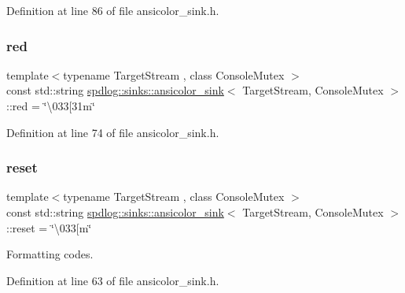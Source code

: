 Definition at line 86 of file ansicolor\+\_\+sink.\+h.

\mbox{\label{classspdlog_1_1sinks_1_1ansicolor__sink_ab5c0ce75c9457f5125a441555287b8d2}} 
\subsubsection{\texorpdfstring{red}{red}}
{\footnotesize\ttfamily template$<$typename Target\+Stream , class Console\+Mutex $>$ \\
const std\+::string \hyperlink{classspdlog_1_1sinks_1_1ansicolor__sink}{spdlog\+::sinks\+::ansicolor\+\_\+sink}$<$ Target\+Stream, Console\+Mutex $>$\+::red = \char`\"{}\textbackslash{}033\mbox{[}31m\char`\"{}}



Definition at line 74 of file ansicolor\+\_\+sink.\+h.

\mbox{\label{classspdlog_1_1sinks_1_1ansicolor__sink_a7a232ef41d85a03d99053ee931fb11a4}} 
\subsubsection{\texorpdfstring{reset}{reset}}
{\footnotesize\ttfamily template$<$typename Target\+Stream , class Console\+Mutex $>$ \\
const std\+::string \hyperlink{classspdlog_1_1sinks_1_1ansicolor__sink}{spdlog\+::sinks\+::ansicolor\+\_\+sink}$<$ Target\+Stream, Console\+Mutex $>$\+::reset = \char`\"{}\textbackslash{}033\mbox{[}m\char`\"{}}



Formatting codes. 



Definition at line 63 of file ansicolor\+\_\+sink.\+h.

\mbox{\label{classspdlog_1_1sinks_1_1ansicolor__sink_ac755cd237351fa5cdf4910e491ddbf97}} 
